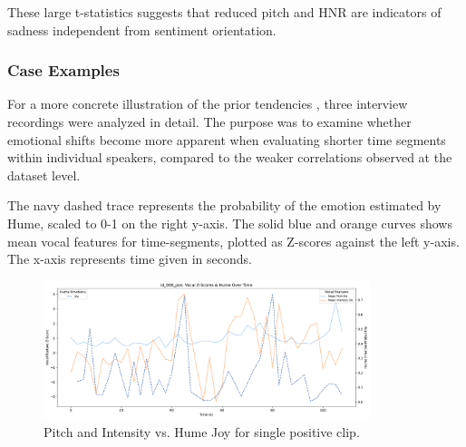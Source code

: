 These large t-statistics suggests that reduced pitch and HNR are indicators of sadness independent from sentiment orientation. 

\subsubsection{Case Examples}
For a more concrete illustration of the prior tendencies , three interview recordings were analyzed in detail. The purpose was to examine whether emotional shifts become more apparent when evaluating shorter time segments within individual speakers, compared to the weaker correlations observed at the dataset level.

The navy dashed trace represents the probability of the emotion estimated by Hume, scaled to 0-1 on the right y-axis. 
The solid blue and orange curves shows mean vocal features for time-segments, plotted as Z-scores against the left y-axis. The x-axis represents time given in seconds.

\medskip

\begin{figure}[H]
    \centering
    
    \includegraphics[width=0.85\textwidth]{png/results/rq3_2/combined_zscore_hume_id_006_pos_4.pdf}
    \caption{Pitch and Intensity vs. Hume Joy for single positive clip.}
    \label{fig:006_pos-joy}
\end{figure}

